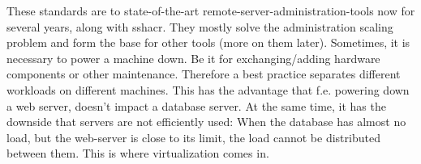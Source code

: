 \newline
These standards are to state-of-the-art remote-server-administration-tools now for several years, along with \gls{sshacr}. They mostly solve the administration scaling problem and form the base for other tools (more on them later). %
\newline
Sometimes, it is necessary to power a machine down. Be it for exchanging/adding hardware components or other maintenance. Therefore a best practice separates different workloads on different machines. This has the advantage that f.e. powering down a web server, doesn't impact a database server. At the same time, it has the downside that servers are not efficiently used: When the database has almost no load, but the web-server is close to its limit, the load cannot be distributed between them. This is where virtualization comes in.






